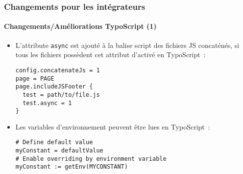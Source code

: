 
\begin{frame}[fragile]
	\frametitle{Changements pour les intégrateurs}
	\framesubtitle{Changements/Améliorations TypoScript (1)}

	\lstset{basicstyle=\smaller\ttfamily}

	\begin{itemize}
		\item L'attribute \texttt{async} est ajouté à la balise script des fichiers JS
			concaténés, si tous les fichiers possèdent cet attribut d'activé
			en TypoScript~:

			\begin{lstlisting}
config.concatenateJs = 1
page = PAGE
page.includeJSFooter {
  test = path/to/file.js
  test.async = 1
}
			\end{lstlisting}

		\item Les variables d'environnement peuvent être lues en TypoScript~:

			\begin{lstlisting}
# Define default value
myConstant = defaultValue
# Enable overriding by environment variable
myConstant := getEnv(MYCONSTANT)
			\end{lstlisting}

	\end{itemize}

\end{frame}


